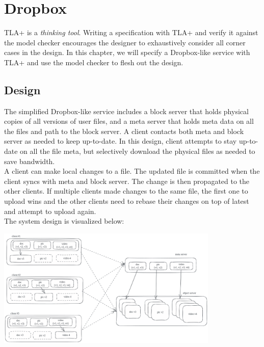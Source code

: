 % 

\usetikzlibrary{arrows.meta} %

\chapter{Dropbox}

TLA+ is a \textit{thinking tool}. Writing a specification with TLA+ and verify
it against the model checker encourages the designer to exhaustively consider
all corner cases in the design. In this chapter, we will specify a Dropbox-like
service with TLA+ and use the model checker to flesh out the design.\\

\section{Design}

The simplified Dropbox-like service includes a block server that holds physical 
copies of all versions of user files, and a meta server that holds meta data on
all the files and path to the block server. A client contacts both meta and
block server as needed to keep up-to-date. In this design, client attempts to
stay up-to-date on all the file meta, but selectively download the physical
files as needed to save bandwidth.\\

A client can make local changes to a file. The updated file is committed when
the client syncs with meta and block server. The change is then propagated to
the other clients. If multiple clients made changes to the same file, the first
one to upload wins and the other clients need to rebase their changes on top of
latest and attempt to upload again.\\

The system design is visualized below:\\

\begin{center}
\includegraphics[width=300pt]{dropbox}
\end{center}

